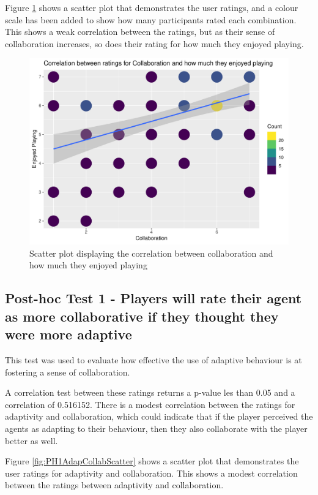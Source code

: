 \documentclass{IEEEtran}
\begin{document}
Figure \ref{fig:H2CollabUXScatter} shows a scatter plot that demonstrates the user ratings, and a colour scale has been added to show how many participants rated each combination. This shows a weak correlation between the ratings, but as their sense of collaboration increases, so does their rating for how much they enjoyed playing.

\begin{figure}
  \centering
  \includegraphics[width=\linewidth]{Images/Graphs/H2CollabUXScatter.pdf}
  
\caption{Scatter plot displaying the correlation between collaboration and how much they enjoyed playing}
\label{fig:H2CollabUXScatter}
\end{figure}

\subsection{Post-hoc Test 1 - Players will rate their agent as more collaborative if they thought they were more adaptive}

This test was used to evaluate how effective the use of adaptive behaviour is at fostering a sense of collaboration.

A correlation test between these ratings returns a p-value les than 0.05 and a correlation of 0.516152. There is a modest correlation between the ratings for adaptivity and collaboration, which could indicate that if the player perceived the agents as adapting to their behaviour, then they also collaborate with the player better as well.

Figure \ref{fig:PH1AdapCollabScatter} shows a scatter plot that demonstrates the user ratings for adaptivity and collaboration. This shows a modest correlation between the ratings between adaptivity and collaboration.
\end{document}
